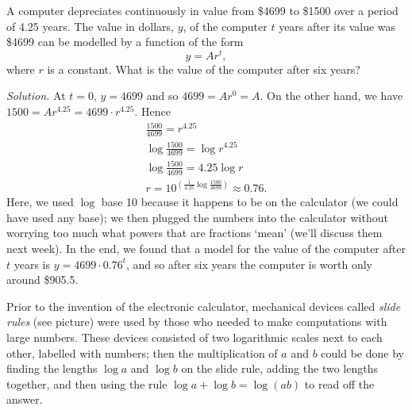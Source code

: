\begin{ex}
  A computer depreciates continuously in value from \$4699 to \$1500 over a period of 4.25 years. The value in dollars, $ y $, of
  the computer $ t $ years after its value was \$4699 can be modelled by a function of the form
  \begin{displaymath}
    y = Ar^t,
  \end{displaymath}
  where $ r $ is a constant. What is the value of the computer after six years?

  \textit{Solution.} At $ t = 0 $, $ y = 4699 $ and so $ 4699 = Ar^0 = A $. On the other
  hand, we have $ 1500 = Ar^{4.25} = 4699 \cdot r^{4.25} $. Hence
  \begin{gather*}
    \frac{1500}{4699} = r^{4.25}\\
    \log \frac{1500}{4699} = \log r^{4.25}\\
    \log \frac{1500}{4699} = 4.25 \log r\\
    r = 10^{\left(\frac{1}{4.25} \log \frac{1500}{4699} \right)} \approx 0.76.
  \end{gather*}
  Here, we used $ \log $ base 10 because it happens to be on the calculator (we could have used any base); we then plugged
  the numbers into the calculator without worrying too much what powers that are fractions `mean' (we'll discuss them next week).
  In the end, we found that a model for the value of the computer after $ t $ years is $ y = 4699 \cdot 0.76^t $, and so
  after six years the computer is worth only around \$905.5.
  \begin{center}
  \end{center}
\end{ex}

Prior to the invention of the electronic calculator, mechanical devices called \emph{slide rules} (see picture) were used
by those who needed to make computations with large numbers. These devices consisted of two logarithmic scales next to each
other, labelled with numbers; then the multiplication of $ a $ and $ b $ could be done by finding the lengths $ \log a $
and $ \log b $ on the slide rule, adding the two lengths together, and then using the rule $ \log a + \log b = \log(ab) $
to read off the answer.

